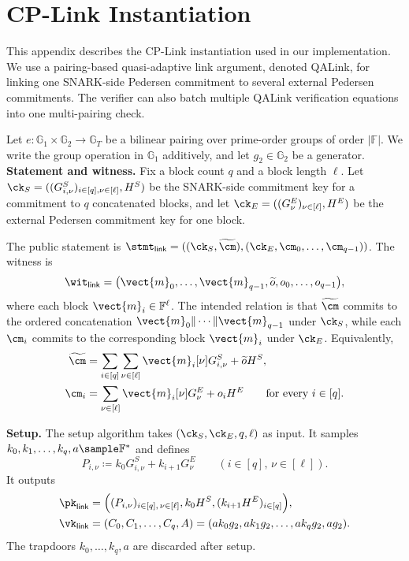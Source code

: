 \section{CP-Link Instantiation}
\label{app:cplink-instant}

This appendix describes the CP-Link instantiation used in our implementation.
We use a pairing-based quasi-adaptive link argument, denoted QALink, for
linking one SNARK-side Pedersen commitment to several external Pedersen
commitments.  The verifier can also batch multiple QALink verification
equations into one multi-pairing check.

Let \(e:\mathbb{G}_1\times\mathbb{G}_2\to\mathbb{G}_T\) be a bilinear pairing
over prime-order groups of order \(|\mathbb{F}|\).  We write the group
operation in \(\mathbb{G}_1\) additively, and let \(g_2\in\mathbb{G}_2\) be a
generator. \\

\noindent\textbf{Statement and witness.}
Fix a block count \(q\) and a block length \(\ell\).  Let
\(\ck_S=((G^S_{i,\nu})_{i\in[q],\nu\in[\ell]},H^S)\) be the SNARK-side
commitment key for a commitment to \(q\) concatenated blocks, and let
\(\ck_E=((G^E_{\nu})_{\nu\in[\ell]},H^E)\) be the external Pedersen commitment
key for one block.

The public statement is
\(\stmt_{\mathsf{link}}=((\ck_S,\widetilde{\cm}),
(\ck_E,\cm_0,\ldots,\cm_{q-1}))\).  The witness is
\[
  \wit_{\mathsf{link}}
  =
  \big(
    \vect{m}_0,\ldots,\vect{m}_{q-1},
    \widetilde{o},
    o_0,\ldots,o_{q-1}
  \big),
\]
where each block \(\vect{m}_i\in\mathbb{F}^{\ell}\).  The intended relation is
that \(\widetilde{\cm}\) commits to the ordered concatenation
\(\vect{m}_0\|\cdots\|\vect{m}_{q-1}\) under \(\ck_S\), while each
\(\cm_i\) commits to the corresponding block \(\vect{m}_i\) under \(\ck_E\).
Equivalently,
\[
\begin{aligned}
  \widetilde{\cm}
  &=
  \sum_{i\in[q]}\sum_{\nu\in[\ell]}
  \vect{m}_i[\nu]G^S_{i,\nu}
  +
  \widetilde{o}H^S, \\
  \cm_i
  &=
  \sum_{\nu\in[\ell]}
  \vect{m}_i[\nu]G^E_{\nu}
  +
  o_iH^E
  \qquad \text{for every } i\in[q].
\end{aligned}
\]

\noindent\textbf{Setup.}
The setup algorithm takes \((\ck_S,\ck_E,q,\ell)\) as input.  It samples
\(k_0,k_1,\ldots,k_q,a\sample\mathbb{F}^{\ast}\) and defines
\[
  P_{i,\nu} \coloneqq k_0G^S_{i,\nu}+k_{i+1}G^E_{\nu}
  \qquad
  (i\in[q],\,\nu\in[\ell]).
\]
It outputs
\[
\begin{aligned}
  \pk_{\mathsf{link}}
  &=
  \Big(
    (P_{i,\nu})_{i\in[q],\,\nu\in[\ell]},
    k_0H^S,
    (k_{i+1}H^E)_{i\in[q]}
  \Big), \\
  \vk_{\mathsf{link}}
  &=
  (C_0,C_1,\ldots,C_q,A)
  =
  (ak_0g_2,ak_1g_2,\ldots,ak_qg_2,ag_2).
\end{aligned}
\]
The trapdoors \(k_0,\ldots,k_q,a\) are discarded after setup. \\

